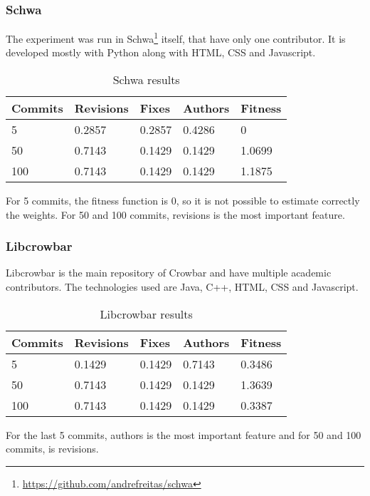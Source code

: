 \subsubsection{Schwa}
The experiment was run in
Schwa\footnote{\url{https://github.com/andrefreitas/schwa}} itself, that have
only one contributor. It is developed mostly with Python along with HTML, CSS
and Javascript.

\begin{table}[H]
    \centering
    \caption{Schwa results}
    \label{table:learning_schwa}
    \begin{tabular}{|l|l|l|l|l|}
        \hline
        Commits & Revisions & Fixes & Authors & Fitness \\ \hline
        5 & 0.2857 & 0.2857 & 0.4286 & 0 \\ \hline
        50 & 0.7143 & 0.1429 & 0.1429 & 1.0699 \\ \hline
        100 & 0.7143 & 0.1429 & 0.1429 & 1.1875 \\ \hline
    \end{tabular}
\end{table}

For 5 commits, the fitness function is 0, so it is not possible to estimate
correctly the weights. For 50 and 100 commits, revisions is the most important
feature.

\subsubsection{Libcrowbar}
Libcrowbar is the main repository of Crowbar and have multiple academic
contributors. The technologies used are Java, C++, HTML, CSS and Javascript.

\begin{table}[H]
    \centering
    \caption{Libcrowbar results}
    \label{table:learning_libcrowbar}
    \begin{tabular}{|l|l|l|l|l|}
        \hline
        Commits & Revisions & Fixes & Authors & Fitness \\ \hline
        5 & 0.1429 & 0.1429 & 0.7143 & 0.3486 \\ \hline
        50 & 0.7143 & 0.1429 & 0.1429 & 1.3639 \\ \hline
        100 & 0.7143 & 0.1429 & 0.1429 & 0.3387 \\ \hline
    \end{tabular}
\end{table}
For the last 5 commits, authors is the most important feature and for 50 and 100
commits, is revisions.


